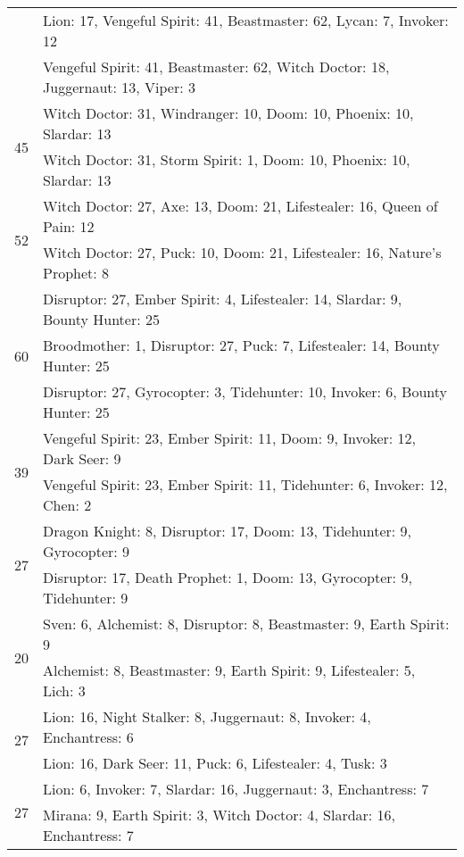 \documentclass[result.tex]{subfiles}
\begin{document}
\begin{table}[H]
\begin{tabular}{ | c | p{12.5cm} | }
    & Lion: 17, Vengeful Spirit: 41, Beastmaster: 62, Lycan: 7, Invoker: 12 \\
    & Vengeful Spirit: 41, Beastmaster: 62, Witch Doctor: 18, Juggernaut: 13, Viper: 3 \\
    \hline
    \multirow{2}{*}{45}
    & Witch Doctor: 31, Windranger: 10, Doom: 10, Phoenix: 10, Slardar: 13 \\
    & Witch Doctor: 31, Storm Spirit: 1, Doom: 10, Phoenix: 10, Slardar: 13 \\
    \hline
    \multirow{2}{*}{52}
    & Witch Doctor: 27, Axe: 13, Doom: 21, Lifestealer: 16, Queen of Pain: 12 \\
    & Witch Doctor: 27, Puck: 10, Doom: 21, Lifestealer: 16, Nature's Prophet: 8 \\
    \hline
    \multirow{3}{*}{60}
    & Disruptor: 27, Ember Spirit: 4, Lifestealer: 14, Slardar: 9, Bounty Hunter: 25 \\
    & Broodmother: 1, Disruptor: 27, Puck: 7, Lifestealer: 14, Bounty Hunter: 25 \\
    & Disruptor: 27, Gyrocopter: 3, Tidehunter: 10, Invoker: 6, Bounty Hunter: 25 \\
    \hline
    \multirow{2}{*}{39}
    & Vengeful Spirit: 23, Ember Spirit: 11, Doom: 9, Invoker: 12, Dark Seer: 9 \\
    & Vengeful Spirit: 23, Ember Spirit: 11, Tidehunter: 6, Invoker: 12, Chen: 2 \\
    \hline
    \multirow{2}{*}{27}
    & Dragon Knight: 8, Disruptor: 17, Doom: 13, Tidehunter: 9, Gyrocopter: 9 \\
    & Disruptor: 17, Death Prophet: 1, Doom: 13, Gyrocopter: 9, Tidehunter: 9 \\
    \hline
    \multirow{2}{*}{20}
    & Sven: 6, Alchemist: 8, Disruptor: 8, Beastmaster: 9, Earth Spirit: 9 \\
    & Alchemist: 8, Beastmaster: 9, Earth Spirit: 9, Lifestealer: 5, Lich: 3 \\
    \hline
    \multirow{2}{*}{27}
    & Lion: 16, Night Stalker: 8, Juggernaut: 8, Invoker: 4, Enchantress: 6 \\
    & Lion: 16, Dark Seer: 11, Puck: 6, Lifestealer: 4, Tusk: 3 \\
    \hline
    \multirow{2}{*}{27}
    & Lion: 6, Invoker: 7, Slardar: 16, Juggernaut: 3, Enchantress: 7 \\
    & Mirana: 9, Earth Spirit: 3, Witch Doctor: 4, Slardar: 16, Enchantress: 7 \\
    \hline
  \end{tabular}
  \caption{}
  \label{}
\end{table}
\end{document}
